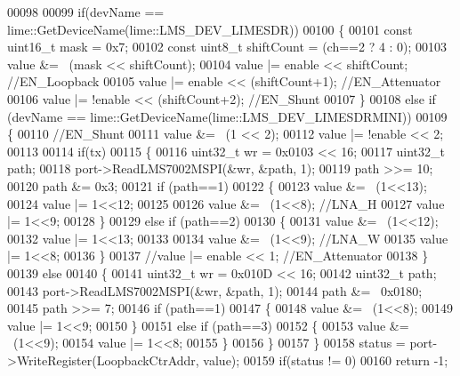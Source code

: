 \begin{DoxyCode}
00098 
00099     \textcolor{keywordflow}{if}(devName == lime::GetDeviceName(lime::LMS_DEV_LIMESDR))
00100     \{
00101         \textcolor{keyword}{const} uint16\_t mask = 0x7;
00102         \textcolor{keyword}{const} uint8\_t shiftCount = (ch==2 ? 4 : 0);
00103         value &= ~(mask << shiftCount);
00104         value |= enable << shiftCount;   \textcolor{comment}{//EN\_Loopback}
00105         value |= enable << (shiftCount+1); \textcolor{comment}{//EN\_Attenuator}
00106         value |= !enable << (shiftCount+2); \textcolor{comment}{//EN\_Shunt}
00107     \}
00108     \textcolor{keywordflow}{else} \textcolor{keywordflow}{if} (devName == lime::GetDeviceName(lime::LMS_DEV_LIMESDRMINI))
00109     \{
00110         \textcolor{comment}{//EN\_Shunt}
00111         value &= ~(1 << 2);
00112         value |= !enable << 2;
00113 
00114         \textcolor{keywordflow}{if}(tx)
00115         \{
00116             uint32\_t wr = 0x0103 << 16;
00117             uint32\_t path;
00118             port->ReadLMS7002MSPI(&wr, &path, 1);
00119             path >>= 10;
00120             path &= 0x3;
00121             \textcolor{keywordflow}{if} (path==1)
00122             \{
00123                 value &= ~(1<<13);
00124                 value |= 1<<12;
00125 
00126                 value &= ~(1<<8); \textcolor{comment}{//LNA\_H}
00127                 value |= 1<<9;
00128             \}
00129             \textcolor{keywordflow}{else} \textcolor{keywordflow}{if} (path==2)
00130             \{
00131                 value &= ~(1<<12);
00132                 value |= 1<<13;
00133 
00134                 value &= ~(1<<9); \textcolor{comment}{//LNA\_W}
00135                 value |= 1<<8;
00136             \}
00137             \textcolor{comment}{//value |= enable << 1; //EN\_Attenuator}
00138         \}
00139         \textcolor{keywordflow}{else}
00140         \{
00141             uint32\_t wr = 0x010D << 16;
00142             uint32\_t path;
00143             port->ReadLMS7002MSPI(&wr, &path, 1);
00144             path &= ~0x0180;
00145             path >>= 7;
00146             \textcolor{keywordflow}{if} (path==1)
00147             \{
00148                 value &= ~(1<<8);
00149                 value |= 1<<9;
00150             \}
00151             \textcolor{keywordflow}{else} \textcolor{keywordflow}{if} (path==3)
00152             \{
00153                 value &= ~(1<<9);
00154                 value |= 1<<8;
00155             \}
00156         \}
00157     \}
00158     status = port->WriteRegister(LoopbackCtrAddr, value);
00159     \textcolor{keywordflow}{if}(status != 0)
00160         \textcolor{keywordflow}{return} -1;

\end{DoxyCode}
